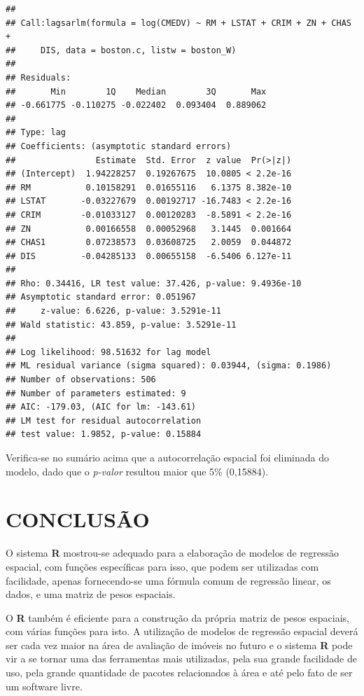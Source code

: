 \documentclass[12pt,]{article}
\begin{document}
\begin{verbatim}
## 
## Call:lagsarlm(formula = log(CMEDV) ~ RM + LSTAT + CRIM + ZN + CHAS + 
##     DIS, data = boston.c, listw = boston_W)
## 
## Residuals:
##       Min        1Q    Median        3Q       Max 
## -0.661775 -0.110275 -0.022402  0.093404  0.889062 
## 
## Type: lag 
## Coefficients: (asymptotic standard errors) 
##                Estimate  Std. Error  z value  Pr(>|z|)
## (Intercept)  1.94228257  0.19267675  10.0805 < 2.2e-16
## RM           0.10158291  0.01655116   6.1375 8.382e-10
## LSTAT       -0.03227679  0.00192717 -16.7483 < 2.2e-16
## CRIM        -0.01033127  0.00120283  -8.5891 < 2.2e-16
## ZN           0.00166558  0.00052968   3.1445  0.001664
## CHAS1        0.07238573  0.03608725   2.0059  0.044872
## DIS         -0.04285133  0.00655158  -6.5406 6.127e-11
## 
## Rho: 0.34416, LR test value: 37.426, p-value: 9.4936e-10
## Asymptotic standard error: 0.051967
##     z-value: 6.6226, p-value: 3.5291e-11
## Wald statistic: 43.859, p-value: 3.5291e-11
## 
## Log likelihood: 98.51632 for lag model
## ML residual variance (sigma squared): 0.03944, (sigma: 0.1986)
## Number of observations: 506 
## Number of parameters estimated: 9 
## AIC: -179.03, (AIC for lm: -143.61)
## LM test for residual autocorrelation
## test value: 1.9852, p-value: 0.15884
\end{verbatim}

Verifica-se no sumário acima que a autocorrelação espacial foi eliminada
do modelo, dado que o \emph{p-valor} resultou maior que 5\% (0,15884).

\section{CONCLUSÃO}\label{conclusao}

O sistema \textbf{R} mostrou-se adequado para a elaboração de modelos de
regressão espacial, com funções específicas para isso, que podem ser
utilizadas com facilidade, apenas fornecendo-se uma fórmula comum de
regressão linear, os dados, e uma matriz de pesos espaciais.

O \textbf{R} também é eficiente para a construção da própria matriz de
pesos espaciais, com várias funções para isto. A utilização de modelos
de regressão espacial deverá ser cada vez maior na área de avaliação de
imóveis no futuro e o sistema \textbf{R} pode vir a se tornar uma das
ferramentas mais utilizadas, pela sua grande facilidade de uso, pela
grande quantidade de pacotes relacionados à área e até pelo fato de ser
um software livre.
\end{document}

